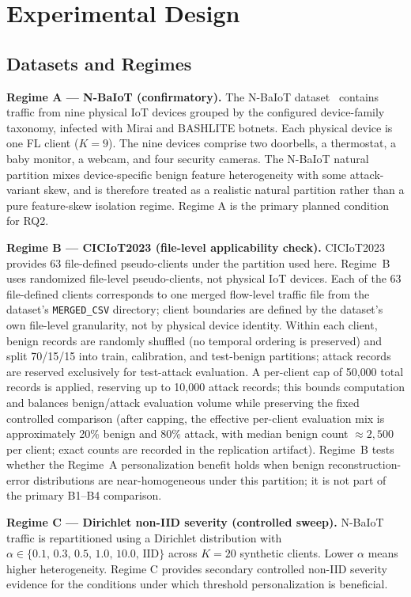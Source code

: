 \section{Experimental Design}
\label{sec:experiments}

\subsection{Datasets and Regimes}

\textbf{Regime A --- N-BaIoT (confirmatory).}
The N-BaIoT dataset~\cite{meidan2018n} contains traffic from nine physical IoT devices
grouped by the configured device-family taxonomy, infected with Mirai and BASHLITE botnets.
Each physical device is one FL client ($K=9$).
The nine devices comprise two doorbells, a thermostat, a baby monitor, a webcam,
and four security cameras.
The N-BaIoT natural partition mixes device-specific benign feature heterogeneity with some
attack-variant skew, and is therefore treated as a realistic natural partition rather than a
pure feature-skew isolation regime.
Regime A is the primary planned condition for RQ2.

\textbf{Regime B --- CICIoT2023 (file-level applicability check).}
CICIoT2023~\cite{neto2023ciciot2023} provides 63 file-defined pseudo-clients under the partition used here.
Regime~B uses randomized file-level pseudo-clients, not physical IoT devices.
Each of the 63 file-defined clients corresponds to one merged flow-level traffic file from the dataset's
\texttt{MERGED\_CSV} directory; client boundaries are defined by the dataset's own
file-level granularity, not by physical device identity.
Within each client, benign records are randomly shuffled (no temporal ordering is preserved)
and split 70/15/15 into train, calibration, and test-benign partitions; attack records
are reserved exclusively for test-attack evaluation.
A per-client cap of 50{,}000 total records is applied, reserving up to 10{,}000 attack records;
this bounds computation and balances benign/attack evaluation volume while preserving
the fixed controlled comparison (after capping, the effective per-client evaluation mix is
approximately 20\% benign and 80\% attack, with median benign count ${\approx}2{,}500$
per client; exact counts are recorded in the replication artifact).
Regime~B tests whether the Regime~A personalization benefit holds when benign
reconstruction-error distributions are near-homogeneous under this partition;
it is not part of the primary B1--B4 comparison.

\textbf{Regime C --- Dirichlet non-IID severity (controlled sweep).}
N-BaIoT traffic is repartitioned using a Dirichlet distribution with
$\alpha \in \{0.1,\, 0.3,\, 0.5,\, 1.0,\, 10.0,\, \mathrm{IID}\}$ across $K=20$ synthetic clients.
Lower $\alpha$ means higher heterogeneity.
Regime C provides secondary controlled non-IID severity evidence for the conditions under which threshold personalization is beneficial.

